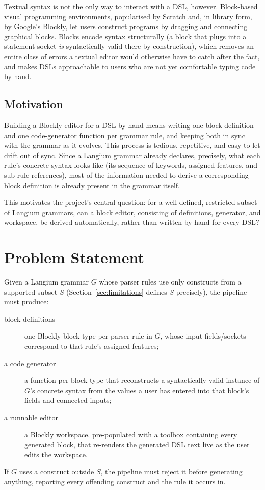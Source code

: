 \documentclass[runningheads]{llncs}
\begin{document}
Textual syntax is not the only way to interact with a DSL, however. Block-based visual programming environments, popularised by Scratch and, in library form, by Google's \href{https://developers.google.com/blockly}{Blockly}, let users construct programs by dragging and connecting graphical blocks. Blocks encode syntax structurally (a block that plugs into a statement socket \emph{is} syntactically valid there by construction), which removes an entire class of errors a textual editor would otherwise have to catch after the fact, and makes DSLs approachable to users who are not yet comfortable typing code by hand.

\subsection{Motivation}
Building a Blockly editor for a DSL by hand means writing one block definition and one code-generator function per grammar rule, and keeping both in sync with the grammar as it evolves. This process is tedious, repetitive, and easy to let drift out of sync. Since a Langium grammar already declares, precisely, what each rule's concrete syntax looks like (its sequence of keywords, assigned features, and sub-rule references), most of the information needed to derive a corresponding block definition is already present in the grammar itself.

This motivates the project's central question: for a well-defined, restricted subset of Langium grammars, can a block editor, consisting of definitions, generator, and workspace, be derived automatically, rather than written by hand for every DSL?

\section{Problem Statement}
Given a Langium grammar $G$ whose parser rules use only constructs from a supported subset $S$ (Section~\ref{sec:limitations} defines $S$ precisely), the pipeline must produce:
\begin{description}
\item[block definitions] one Blockly block type per parser rule in $G$, whose input fields/sockets correspond to that rule's assigned features;
\item[a code generator] a function per block type that reconstructs a syntactically valid instance of $G$'s concrete syntax from the values a user has entered into that block's fields and connected inputs;
\item[a runnable editor] a Blockly workspace, pre-populated with a toolbox containing every generated block, that re-renders the generated DSL text live as the user edits the workspace.
\end{description}
If $G$ uses a construct outside $S$, the pipeline must reject it before generating anything, reporting every offending construct and the rule it occurs in.
\end{document}
